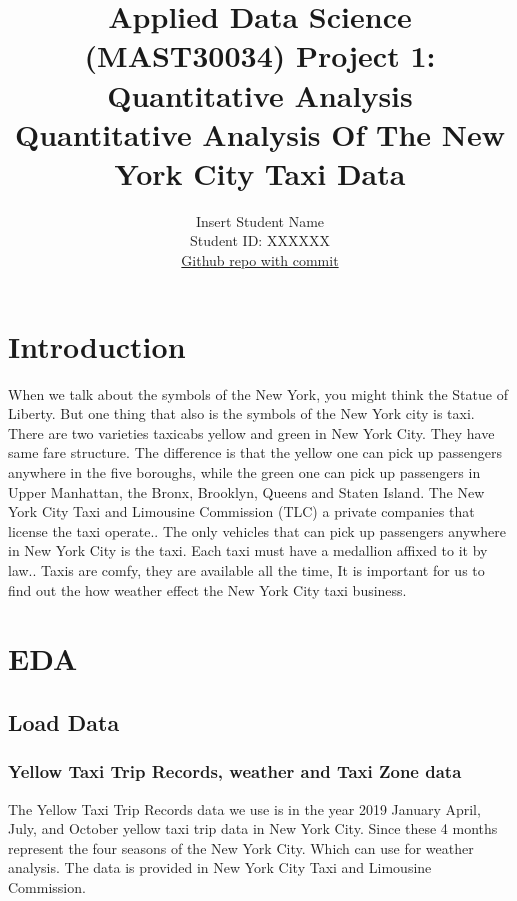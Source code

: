 \documentclass[11pt]{article}
\title{\textbf{Applied Data Science (MAST30034) Project 1: Quantitative Analysis} \\ Quantitative Analysis Of The New York City Taxi Data}
\author{
Insert Student Name \\
Student ID: XXXXXX \\
\href{https://github.com/MAST30034-Applied-Data-Science/mast30034\_p1\_template/tree/fd9f1dd17fdbcb5b119b70c93a22da8210d44fd7}{Github repo with commit}
}
\begin{document}
\maketitle

\section{Introduction}

When we talk about the symbols of the New York, you might think the Statue of Liberty. But one thing that also is the symbols of the New York city is taxi. There are two varieties taxicabs yellow and green in New York City. They have same fare structure. The difference is that the yellow one can pick up passengers anywhere in the five boroughs, while the green one can pick up passengers in Upper Manhattan, the Bronx, Brooklyn, Queens and Staten Island.  The New York City Taxi and Limousine Commission (TLC) a private companies that license the taxi operate.\cite{Taxis}.
The only vehicles that can pick up passengers anywhere in New York City is the taxi. Each taxi must have a medallion affixed to it by law.\cite{YellowCab}. Taxis are comfy, they are available all the time, It is important for us to find out the how weather effect the New York City taxi business.  


\section{EDA}

\subsection{Load Data}

\subsubsection{Yellow Taxi Trip Records, weather and Taxi Zone data}
The Yellow Taxi Trip Records data we use is in the year 2019 January April, July, and October yellow taxi trip data in New York City. Since these 4 months represent the four seasons of the New York City. Which can use for weather analysis. The data is provided in New York City Taxi and Limousine Commission.
\end{document}
